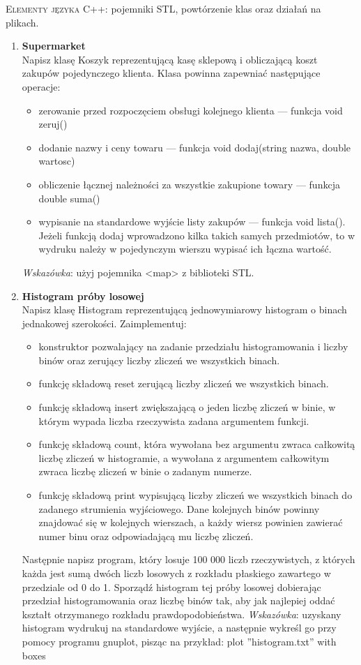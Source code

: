 \documentclass[12pt]{article}
\begin{document}
\small \textsc{Elementy języka C++:} pojemniki STL, powtórzenie klas oraz działań na plikach.

\begin{enumerate}

\item \textbf{Supermarket}\\
Napisz klasę \textsf{Koszyk} reprezentującą kasę sklepową i obliczającą koszt zakupów pojedynczego
klienta. Klasa powinna zapewniać następujące operacje:
\begin{itemize}
\item zerowanie przed rozpoczęciem obsługi kolejnego klienta — funkcja \textsf{void zeruj()}
\item dodanie nazwy i ceny towaru — funkcja \textsf{void dodaj(string nazwa, double wartosc)}
\item obliczenie łącznej należności za wszystkie zakupione towary — funkcja \textsf{double suma()}
\item wypisanie na standardowe wyjście listy zakupów — funkcja \textsf{void lista()}. Jeżeli
funkcją \textsf{dodaj} wprowadzono kilka takich samych przedmiotów, to w wydruku należy w pojedynczym
wierszu wypisać ich łączna wartość.
\end{itemize}
\textit{Wskazówka}: użyj pojemnika \textsf{<map>} z biblioteki STL.

\item \textbf{Histogram próby losowej}\\
Napisz klasę \textsf{Histogram} reprezentującą jednowymiarowy histogram o binach jednakowej szerokości.
Zaimplementuj:
\begin{itemize}
\item konstruktor pozwalający na zadanie przedziału histogramowania i liczby binów oraz zerujący liczby
zliczeń we wszystkich binach.
\item funkcję składową \textsf{reset} zerującą liczby zliczeń we wszystkich binach.
\item funkcję składową \textsf{insert} zwiększającą o jeden liczbę zliczeń w binie, w którym wypada liczba
rzeczywista zadana argumentem funkcji.
\item funkcję składową \textsf{count}, która wywołana bez argumentu zwraca całkowitą liczbę zliczeń w histogramie,
a wywołana z argumentem całkowitym zwraca liczbę zliczeń w binie o zadanym numerze.
\item funkcję składową \textsf{print} wypisującą liczby zliczeń we wszystkich binach do zadanego strumienia
wyjściowego. Dane kolejnych binów powinny znajdować się w kolejnych wierszach, a każdy wiersz
powinien zawierać numer binu oraz odpowiadającą mu liczbę zliczeń.
\end{itemize}
Następnie napisz program, który losuje 100 000 liczb rzeczywistych, z których każda jest sumą dwóch
liczb losowych z rozkładu płaskiego zawartego w przedziale od 0 do 1. Sporządź histogram tej próby losowej
dobierając przedział histogramowania oraz liczbę binów tak, aby jak najlepiej oddać kształt otrzymanego
rozkładu prawdopodobieństwa. \textit{Wskazówka}: uzyskany histogram wydrukuj na standardowe wyjście, a następnie
wykreśl go przy pomocy programu \textsf{gnuplot}, pisząc na przykład:
\textsf{plot ''histogram.txt'' with boxes}


\end{enumerate}
\end{document}
